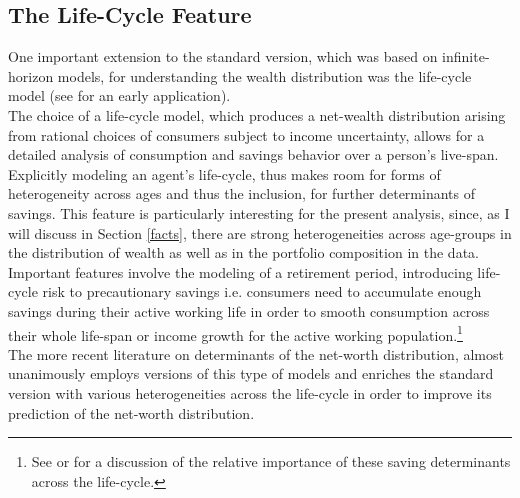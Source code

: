 \documentclass[12pt,a4paper,leqno]{article}
\theoremstyle{definition}
\begin{document}
\subsection{The Life-Cycle Feature}
One important extension to the standard version, which was based on infinite-horizon models, for understanding the wealth distribution was the life-cycle model (see \cite{huggett1996wealth} for an early application).\\
The choice of a life-cycle model, which produces a net-wealth distribution arising from rational choices of consumers subject to income uncertainty, allows for a detailed analysis of consumption and savings behavior over a person's live-span. 
Explicitly modeling an agent's life-cycle, thus makes room for forms of heterogeneity across ages and thus the inclusion, for further determinants of savings. This feature is particularly interesting for the present analysis, since, as I will discuss in Section \ref{facts}, there are strong heterogeneities across age-groups in the distribution of wealth as well as in the portfolio composition in the data.\\
Important features involve the modeling of a retirement period, introducing life-cycle risk to precautionary savings i.e. consumers need to accumulate enough savings during their active working life in order to smooth consumption across their whole life-span or income growth for the active working population.\footnote{See \cite{cagetti2003} or \cite{Gourinchas&Parker2002} for a discussion of the relative importance of these saving determinants across the life-cycle.}
\\
The more recent literature on determinants of the net-worth distribution, almost unanimously employs versions of this type of models and enriches the standard version with various heterogeneities across the life-cycle in order to improve its prediction of the net-worth distribution.
\end{document}
